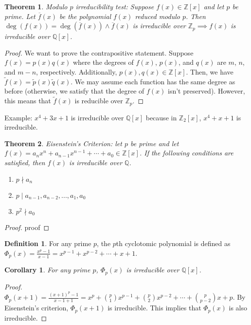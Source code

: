 \documentclass{article}
\theoremstyle{definition}
\newtheorem{definition}{Definition}
\theoremstyle{plain}
\newtheorem{theorem}{Theorem}
\theoremstyle{corollary}
\newtheorem{corollary}{Corollary}
\theoremstyle{lemma}
\begin{document}
\begin{theorem}
    Modulo $p$ irreducibility test: Suppose $f(x)\in\mathbb{Z}[x]$ and let $p$ be prime. Let $\overline{f}(x)$ be the polynomial $f(x)$ reduced modulo $p$. Then $\deg(f(x))=\deg(\overline{f}(x))\land\overline{f}(x)$ is irreducible over $\mathbb{Z}_p\implies f(x)$ is irreducible over $\mathbb{Q}[x]$.
\end{theorem}

\begin{proof}
    We want to prove the contrapositive statement. Suppose $f(x)=p(x)q(x)$ where the degrees of $f(x)$, $p(x)$, and $q(x)$ are $m$, $n$, and $m-n$, respectively. Additionally, $p(x),q(x)\in\mathbb{Z}[x]$. Then, we have $\tilde{f}(x)=\tilde{p}(x)\tilde{q}(x)$. We may assume each function has the same degree as before (otherwise, we satisfy that the degree of $f(x)$ isn't preserved). However, this means that $\tilde{f}(x)$ is reducible over $\mathbb{Z}_p$.
\end{proof}

Example: $x^4+3x+1$ is irreducible over $\mathbb{Q}[x]$ because in $\mathbb{Z}_2[x]$, $x^4+x+1$ is irreducible.

\begin{theorem}
    Eisenstein's Criterion: let $p$ be prime and let $f(x)=a_nx^n+a_{n-1}x^{n-1}+\cdots+a_0\in\mathbb{Z}[x]$. If the following conditions are satisfied, then $f(x)$ is irreducible over $\mathbb{Q}$.
    \begin{enumerate}
        \item $p\nmid a_n$
        \item $p\mid a_{n-1},a_{n-2},...,a_1,a_0$
        \item $p^2\nmid a_0$
    \end{enumerate}
\end{theorem}

\begin{proof}
    proof
\end{proof}

\begin{definition}
    For any prime $p$, the $p$th cyclotomic polynomial is defined as $\Phi_p(x)=\frac{x^p-1}{x-1}=x^{p-1}+x^{p-2}+\cdots+x+1$.
\end{definition}

\begin{corollary}
    For any prime $p$, $\Phi_p(x)$ is irreducible over $\mathbb{Q}[x]$.
\end{corollary}

\begin{proof}
    $\Phi_p(x+1)=\frac{(x+1)^p-1}{x-1+1}=x^p+\binom{p}{1}x^{p-1}+\binom{p}{2}x^{p-2}+\cdots+\binom{p}{p-2}x+p$. By Eisenstein's criterion, $\Phi_p(x+1)$ is irreducible. This implies that $\Phi_p(x)$ is also irreducible.
\end{proof}
\end{document}
